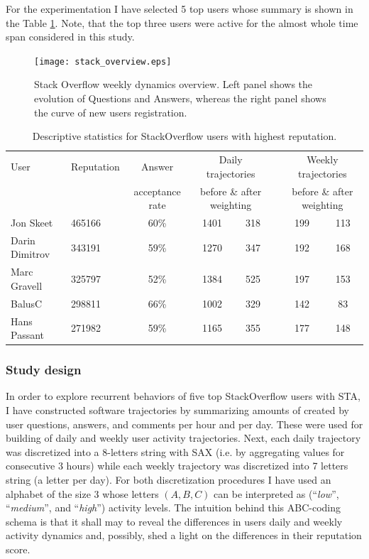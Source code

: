 For the experimentation I have selected 5 top users whose summary is shown in the Table \ref{so_table}. Note, that the top three users were active for the almost whole time span considered in this study.

\begin{figure}
\centering
\texttt{[image: stack\_overview.eps]}
\caption{Stack Overflow weekly dynamics overview. Left panel shows the evolution of Questions and Answers, whereas the right panel shows the curve of new users registration.}
\label{fig:stack_dynamics}   
\end{figure}

\begin{table}[]
\begin{small}
\begin{tabularx}{\linewidth}{l X c c c c c c}
\toprule
User   & Reputation   &   Answer & \multicolumn{2}{c}{Daily  trajectories} & & \multicolumn{2}{c}{Weekly trajectories}\\
& & acceptance rate & \multicolumn{2}{c}{before \& after weighting} & & \multicolumn{2}{c}{before \& after weighting}\\
\midrule
Jon Skeet   & 465166 & 60\% &1401 & 318 & \qquad & 199 & 113 \\
Darin Dimitrov   &  343191 & 59\% & 1270  & 347 & &192 & 168\\
Marc Gravell & 325797 & 52\%  &1384 &525 & &197 & 153 \\
BalusC  & 298811 & 66\% &1002 &329 & &142 & 83 \\
Hans Passant & 271982 & 59\% &1165    &355 & &177 & 148\\
\bottomrule
\end{tabularx}
\caption{Descriptive statistics for StackOverflow users with highest reputation.}
\label{so_table}
\end{small}
\end{table}

\subsubsection{Study design}
In order to explore recurrent behaviors of five top StackOverflow users with STA, I have constructed software trajectories by summarizing amounts of created by user questions, answers, and comments per hour and per day. These were used for building of daily and weekly user activity trajectories. Next, each daily trajectory was discretized into a 8-letters string with SAX (i.e. by aggregating values for consecutive 3 hours) while each weekly trajectory was discretized into 7 letters string (a letter per day). For both discretization procedures I have used an alphabet of the size 3 whose letters $(A,B,C)$ can be interpreted as (``\textit{low}'', ``\textit{medium}'', and ``\textit{high}'') activity levels. The intuition behind this ABC-coding schema is that it shall may to reveal the differences in users daily and weekly activity dynamics and, possibly, shed a light on the differences in their reputation score.

